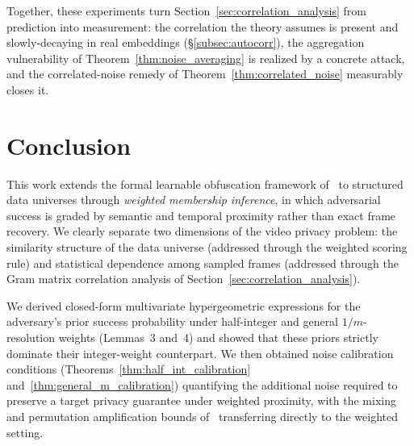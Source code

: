 \documentclass[letterpaper]{article} %
\begin{document}
Together, these experiments turn Section~\ref{sec:correlation_analysis}
from prediction into measurement: the correlation the theory assumes is
present and slowly-decaying in real embeddings
(\S\ref{subsec:autocorr}), the aggregation vulnerability of
Theorem~\ref{thm:noise_averaging} is realized by a concrete attack, and
the correlated-noise remedy of Theorem~\ref{thm:correlated_noise}
measurably closes it.

\section{Conclusion}
\label{sec:conclusion}

This work extends the formal learnable obfuscation framework of~\cite{xiao2024formal} to structured data universes through \emph{weighted membership inference}, in which adversarial success is graded by semantic and temporal proximity rather than exact frame recovery. We clearly separate two dimensions of the video privacy problem: the similarity structure of the data universe (addressed through the weighted scoring rule) and statistical dependence among sampled frames (addressed through the Gram matrix correlation analysis of Section~\ref{sec:correlation_analysis}).

We derived closed-form multivariate hypergeometric expressions for the adversary's prior success probability under half-integer and general $1/m$-resolution weights (Lemmas~3 and~4) and showed that these priors strictly dominate their integer-weight counterpart. We then obtained noise calibration conditions (Theorems~\ref{thm:half_int_calibration} and~\ref{thm:general_m_calibration}) quantifying the additional noise required to preserve a target privacy guarantee under weighted proximity, with the mixing and permutation amplification bounds of~\cite{xiao2024formal} transferring directly to the weighted setting.
\end{document}
